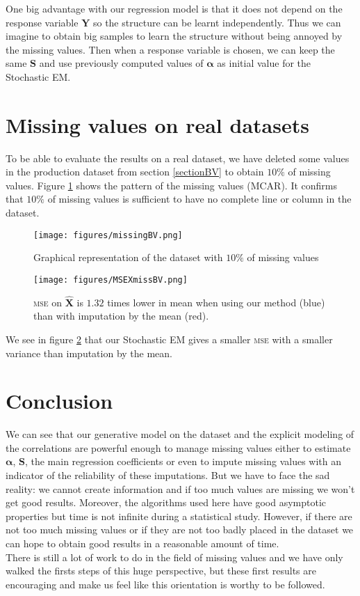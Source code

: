 \documentclass[12pt,a4paper]{report}
\begin{document}
		One big advantage with our regression model is that it does not depend on the response variable $\boldsymbol{Y}$ so the structure can be learnt independently. Thus we can imagine to obtain big samples to learn the structure without being annoyed by the missing values. Then when a response variable is chosen, we can keep the same $\boldsymbol{S}$ and use previously computed values of $\boldsymbol{\alpha}$ as initial value for the Stochastic EM. 

	\section{Missing values on real datasets}	
		To be able to evaluate the results on a real dataset, we have deleted some values in the production dataset from section \ref{sectionBV} to obtain $10\%$ of missing values. Figure \ref{missingBV} shows the pattern of the missing values (MCAR). It confirms that $10\%$ of missing values is sufficient to have no complete line or column in the dataset. 
	
	\begin{figure}[h!]
		\centering
		\texttt{[image: figures/missingBV.png]} 
		\caption{Graphical representation of the dataset with $10\%$ of missing values}\label{missingBV}
	\end{figure}
	\begin{figure}[h!]
		\centering
		\texttt{[image: figures/MSEXmissBV.png]} 
		\caption{\textsc{mse} on $\hat{\boldsymbol{X}}$ is $1.32$ times lower in mean when using our method (blue) than with imputation by the mean (red).}\label{MSEXmissBV}
	\end{figure}
	We see in figure \ref{MSEXmissBV} that our Stochastic EM gives a smaller \textsc{mse} with a smaller variance than imputation by the mean. 
	
\FloatBarrier	
\section{Conclusion}	We can see that our generative model on the dataset and the explicit modeling of the correlations are powerful enough to manage missing values either to estimate $\boldsymbol{\alpha}$, $\boldsymbol{S}$, the main regression coefficients or even to impute missing values with an indicator of the reliability of these imputations. But we have to face the sad reality: we cannot create information and if too much values are missing we won't get good results. Moreover, the algorithms used here have good asymptotic properties but time is not infinite during a statistical study. However, if there are not too much missing values or if they are not too badly placed in the dataset we can hope to obtain good results in a reasonable amount of time.\\
There is still a lot of work to do in the field of missing values and we have only walked the firsts steps of this huge perspective, but these first results are encouraging and make us feel like this orientation is worthy to be followed.
\end{document}
